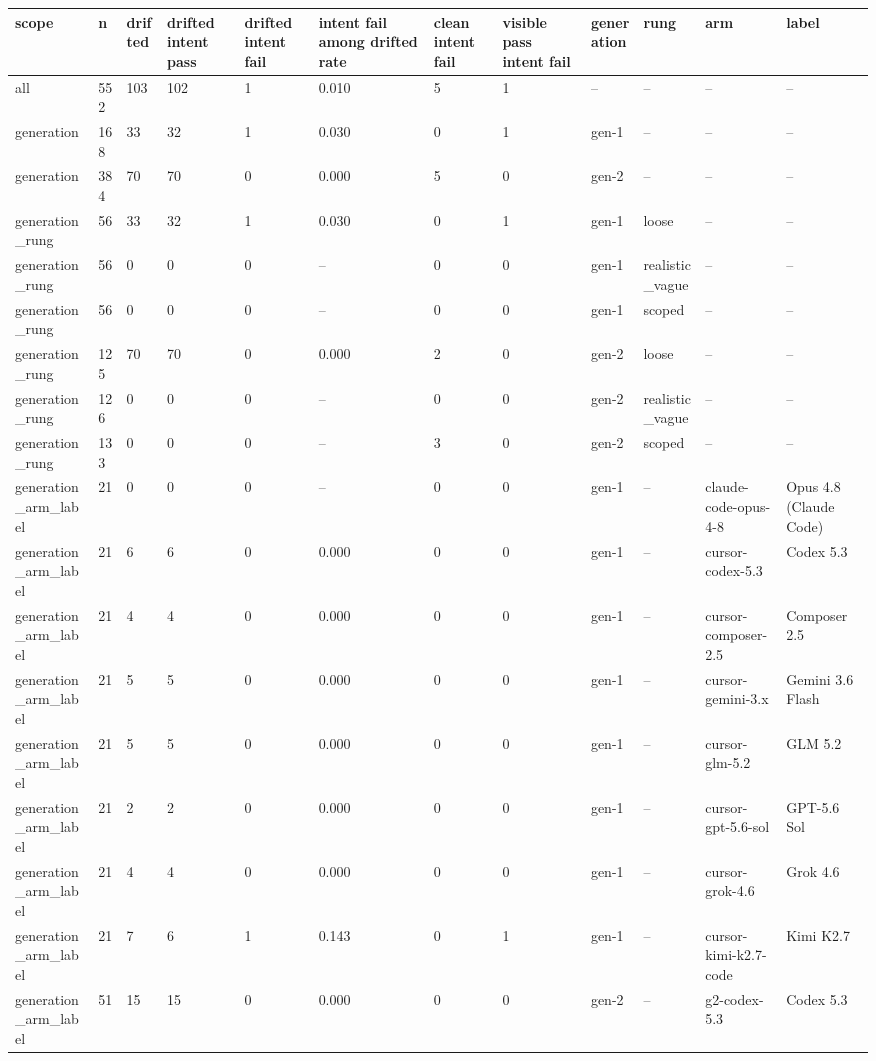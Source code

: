 \begin{tabular}{llllllllllll}
\toprule
scope & n & drifted & drifted intent pass & drifted intent fail & intent fail among drifted rate & clean intent fail & visible pass intent fail & generation & rung & arm & label \\
\midrule
all & 552 & 103 & 102 & 1 & 0.010 & 5 & 1 & -- & -- & -- & -- \\
generation & 168 & 33 & 32 & 1 & 0.030 & 0 & 1 & gen-1 & -- & -- & -- \\
generation & 384 & 70 & 70 & 0 & 0.000 & 5 & 0 & gen-2 & -- & -- & -- \\
generation\_rung & 56 & 33 & 32 & 1 & 0.030 & 0 & 1 & gen-1 & loose & -- & -- \\
generation\_rung & 56 & 0 & 0 & 0 & -- & 0 & 0 & gen-1 & realistic\_vague & -- & -- \\
generation\_rung & 56 & 0 & 0 & 0 & -- & 0 & 0 & gen-1 & scoped & -- & -- \\
generation\_rung & 125 & 70 & 70 & 0 & 0.000 & 2 & 0 & gen-2 & loose & -- & -- \\
generation\_rung & 126 & 0 & 0 & 0 & -- & 0 & 0 & gen-2 & realistic\_vague & -- & -- \\
generation\_rung & 133 & 0 & 0 & 0 & -- & 3 & 0 & gen-2 & scoped & -- & -- \\
generation\_arm\_label & 21 & 0 & 0 & 0 & -- & 0 & 0 & gen-1 & -- & claude-code-opus-4-8 & Opus 4.8 (Claude Code) \\
generation\_arm\_label & 21 & 6 & 6 & 0 & 0.000 & 0 & 0 & gen-1 & -- & cursor-codex-5.3 & Codex 5.3 \\
generation\_arm\_label & 21 & 4 & 4 & 0 & 0.000 & 0 & 0 & gen-1 & -- & cursor-composer-2.5 & Composer 2.5 \\
generation\_arm\_label & 21 & 5 & 5 & 0 & 0.000 & 0 & 0 & gen-1 & -- & cursor-gemini-3.x & Gemini 3.6 Flash \\
generation\_arm\_label & 21 & 5 & 5 & 0 & 0.000 & 0 & 0 & gen-1 & -- & cursor-glm-5.2 & GLM 5.2 \\
generation\_arm\_label & 21 & 2 & 2 & 0 & 0.000 & 0 & 0 & gen-1 & -- & cursor-gpt-5.6-sol & GPT-5.6 Sol \\
generation\_arm\_label & 21 & 4 & 4 & 0 & 0.000 & 0 & 0 & gen-1 & -- & cursor-grok-4.6 & Grok 4.6 \\
generation\_arm\_label & 21 & 7 & 6 & 1 & 0.143 & 0 & 1 & gen-1 & -- & cursor-kimi-k2.7-code & Kimi K2.7 \\
generation\_arm\_label & 51 & 15 & 15 & 0 & 0.000 & 0 & 0 & gen-2 & -- & g2-codex-5.3 & Codex 5.3 \\

\end{tabular}
